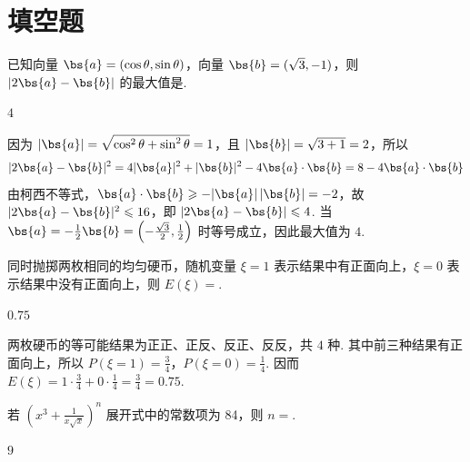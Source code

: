 \section{填空题}
\begin{problem}
已知向量 \(\bs{a}=(\cos\theta,\sin\theta)\)，向量 \(\bs{b}=(\sqrt{3},-1)\)，则 \(\left|2\bs{a}-\bs{b}\right|\) 的最大值是\fillinblank{}.
\end{problem}

\begin{answer}
\(4\)
\end{answer}

\begin{solution}
因为 \(|\bs{a}|=\sqrt{\cos^2\theta+\sin^2\theta}=1\)，且 \(|\bs{b}|=\sqrt{3+1}=2\)，所以
\[
|2\bs{a}-\bs{b}|^2=4|\bs{a}|^2+|\bs{b}|^2-4\bs{a}\cdot\bs{b}=8-4\bs{a}\cdot\bs{b}
\]
由柯西不等式，\(\bs{a}\cdot\bs{b}\geqslant-|\bs{a}|\,|\bs{b}|=-2\)，故 \(|2\bs{a}-\bs{b}|^2\leqslant16\)，即 \(|2\bs{a}-\bs{b}|\leqslant4\). 当 \(\bs{a}=-\frac{1}{2}\bs{b}=\left(-\frac{\sqrt{3}}{2},\frac{1}{2}\right)\) 时等号成立，因此最大值为 \(4\).
\end{solution}

\begin{problem}
同时抛掷两枚相同的均匀硬币，随机变量 \(\xi=1\) 表示结果中有正面向上，\(\xi=0\) 表示结果中没有正面向上，则 \(E(\xi)=\)\fillinblank{}.
\end{problem}

\begin{answer}
\(0.75\)
\end{answer}

\begin{solution}
两枚硬币的等可能结果为正正、正反、反正、反反，共 \(4\) 种. 其中前三种结果有正面向上，所以 \(P(\xi=1)=\frac{3}{4}\)，\(P(\xi=0)=\frac{1}{4}\). 因而 \(E(\xi)=1\cdot\frac{3}{4}+0\cdot\frac{1}{4}=\frac{3}{4}=0.75\).
\end{solution}

\begin{problem}
若 \(\left(x^{3}+\frac{1}{x\sqrt{x}}\right)^n\) 展开式中的常数项为 84，则 \(n=\)\fillinblank{}.
\end{problem}

\begin{answer}
\(9\)
\end{answer}

